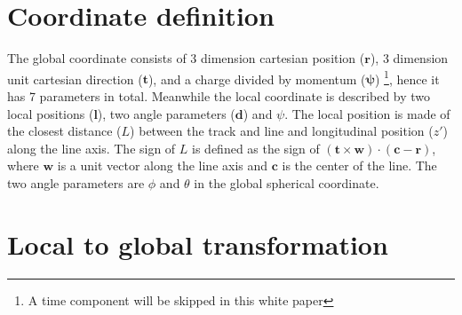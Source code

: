 \documentclass[12pt,a4paper]{scrarticle}
\begin{document}
\maketitle

\begin{abstract}
    
\end{abstract}

\tableofcontents


\section{Coordinate definition}
 The global coordinate consists of 3 dimension cartesian position ($\mathbf{r}$), 3 dimension unit cartesian direction ($\mathbf{t}$), and a charge divided by momentum ($\mathbf{\psi}$) \footnote{A time component will be skipped in this white paper}, hence it has 7 parameters in total. Meanwhile the local coordinate is described by two local positions ($\mathbf{l}$), two angle parameters ($\mathbf{d}$) and $\psi$. The local position is made of the closest distance ($L$) between the track and line and longitudinal position ($z'$) along the line axis. The sign of $L$ is defined as the sign of $ (\mathbf{t} \times \mathbf{w}) \cdot (\mathbf{c} - \mathbf{r})$, where $\mathbf{w}$ is a unit vector along the line axis and $\mathbf{c}$ is the center of the line. The two angle parameters are $\phi$ and $\theta$ in the global spherical coordinate.
 
\section{Local to global transformation}
\end{document}

